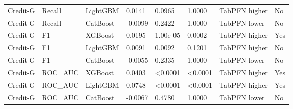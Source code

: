 \begin{longtable}{p{2.6cm}p{1.75cm}p{1.55cm}R{1.1cm}R{1.7cm}R{1.4cm}p{2.2cm}p{1.75cm}}
Credit-G & Recall & LightGBM & 0.0141 & 0.0965 & 1.0000 & TabPFN higher & No \\
Credit-G & Recall & CatBoost & -0.0099 & 0.2422 & 1.0000 & TabPFN lower & No \\
Credit-G & F1 & XGBoost & 0.0195 & 1.00e-05 & 0.0002 & TabPFN higher & Yes \\
Credit-G & F1 & LightGBM & 0.0091 & 0.0092 & 0.1201 & TabPFN higher & No \\
Credit-G & F1 & CatBoost & -0.0055 & 0.2335 & 1.0000 & TabPFN lower & No \\
Credit-G & ROC\_AUC & XGBoost & 0.0403 & <0.0001 & <0.0001 & TabPFN higher & Yes \\
Credit-G & ROC\_AUC & LightGBM & 0.0748 & <0.0001 & <0.0001 & TabPFN higher & Yes \\
Credit-G & ROC\_AUC & CatBoost & -0.0067 & 0.4780 & 1.0000 & TabPFN lower & No \\
\bottomrule
\end{longtable}
\endgroup
